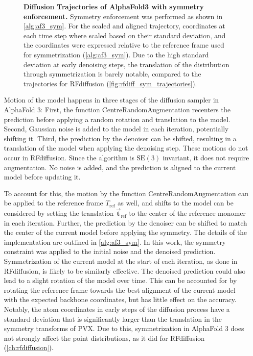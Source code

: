 \begin{figure}[!htb]

\caption{\textbf{Diffusion Trajectories of AlphaFold3 with symmetry enforcement. } Symmetry enforcement was performed as shown in \autoref{alg:af3_sym}. For the scaled and aligned trajectory, coordinates at each time step where scaled based on their standard deviation, and the coordinates were expressed relative to the reference frame used for symmetrization (\autoref{alg:af3_sym}). Due to the high standard deviation at early denoising steps, the translation of the distribution through symmetrization is barely notable, compared to the trajectories for RFdiffusion (\autoref{fig:rfdiff_sym_trajectories}).}
\label{fig:af3_sym_traj}
\end{figure}

Motion of the model happens in three stages of the diffusion sampler in AlphaFold 3: First, the function CentreRandomAugmentation recenters the prediction before applying a random rotation and translation to the model. Second, Gaussian noise is added to the model in each iteration, potentially shifting it. Third, the prediction by the denoiser can be shifted, resulting in a translation of the model when applying the denoising step. These motions do not occur in RFdiffusion. Since the algorithm is $\mathrm{SE}(3)$ invariant, it does not require augmentation. No noise is added, and the prediction is aligned to the current model before updating it. 


To account for this, the motion by the function CentreRandomAugmentation can be applied to the reference frame $T_\text{ref}$ as well, and shifts to the model can be considered by setting the translation $\vec{\mathbf{t}}_{\text{ref}}$ to the center of the reference monomer in each iteration. Further, the prediction by the denoiser can be shifted to match the center of the current model before applying the symmetry. The details of the implementation are outlined in \autoref{alg:af3_sym}. In this work, the symmetry constraint was applied to the initial noise and the denoised prediction. Symmetrization of the current model at the start of each iteration, as done in RFdiffusion, is likely to be similarly effective. The denoised prediction could also lead to a slight rotation of the model over time. This can be accounted for by rotating the reference frame towards the best alignment of the current model with the expected backbone coordinates, but has little effect on the accuracy. Notably, the atom coordinates in early steps of the diffusion process have a standard deviation that is significantly larger than the translation in the symmetry transforms of PVX. Due to this, symmetrization in AlphaFold 3 does not strongly affect the point distributions, as it did for RFdiffusion (\autoref{ch:rfdiffusion}).


